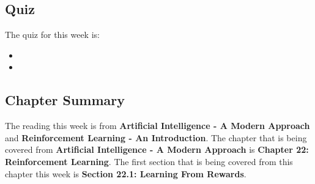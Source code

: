 \subsection{Quiz}

The quiz for this week is:

\begin{itemize}
    \item {}
    \item {}
\end{itemize}

\subsection{Chapter Summary}

The reading this week is from \textbf{Artificial Intelligence - A Modern Approach} and \textbf{Reinforcement Learning - An Introduction}. The chapter that is being covered from \textbf{Artificial Intelligence - A Modern Approach}
is \textbf{Chapter 22: Reinforcement Learning}. The first section that is being covered from this chapter this week is \textbf{Section 22.1: Learning From Rewards}.


